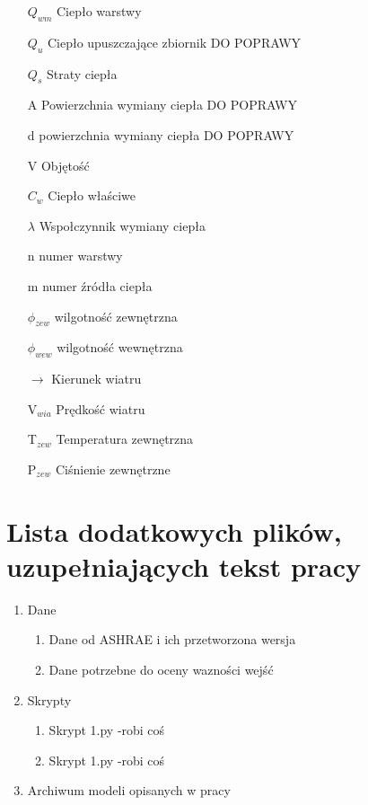 \documentclass[a4paper,twoside,12pt]{book}
\begin{document}
\begin{appendices}
\begin{itemize}
    \item[$Q_{wm}$] Ciepło warstwy
    \item[$Q_u$] Ciepło upuszczające zbiornik DO POPRAWY
    \item[$Q_s$] Straty ciepła
    \item[A] Powierzchnia wymiany ciepła DO POPRAWY
    \item[d] powierzchnia wymiany ciepła DO POPRAWY
    \item[V] Objętość
    \item[$C_w$] Ciepło właściwe
    \item[$\lambda$] Wspołczynnik wymiany ciepła
    \item[n] numer warstwy
    \item[m] numer źródła ciepła
    \item[$\phi_{zew}$] wilgotność zewnętrzna
    \item[$\phi_{wew}$] wilgotność wewnętrzna
    \item[$\longrightarrow$] Kierunek wiatru
    \item[V$_{wia}$] Prędkość wiatru
    \item[T$_{zew}$] Temperatura zewnętrzna
    \item[P$_{zew}$] Ciśnienie zewnętrzne
  \end{itemize}



  \chapter{Lista dodatkowych plików, uzupełniających tekst pracy}

  \begin{enumerate}
    \item Dane
          \begin{enumerate}
            \item Dane od ASHRAE i ich przetworzona wersja
            \item Dane potrzebne do oceny wazności wejść
          \end{enumerate}
    \item Skrypty
          \begin{enumerate}
            \item Skrypt 1.py -robi coś
            \item Skrypt 1.py -robi coś
          \end{enumerate}
    \item Archiwum modeli opisanych w pracy
  \end{enumerate}



  \listoffigures
  \listoftables

\end{appendices}
\end{document}
